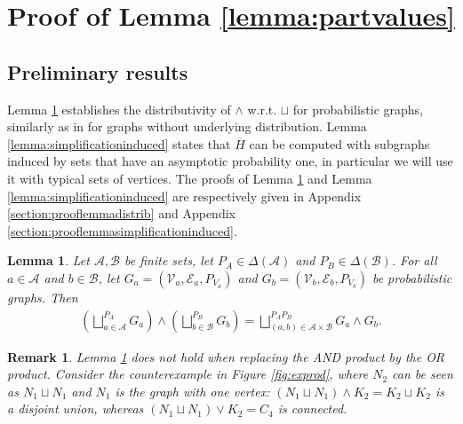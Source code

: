 \documentclass[conference,a4paper]{IEEEtran}
\newtheorem{lemma}{Lemma}
\newtheorem{remark}[theorem]{Remark}
\begin{document}
\section{Proof of Lemma \ref{lemma:partvalues}}\label{section:prooflemmapartvalues}

\subsection{Preliminary results}

Lemma \ref{lemma:distrib} establishes the distributivity of $\wedge$ w.r.t. $\sqcup$ for probabilistic graphs, similarly as in \cite{zuiddam2018algebraic} for graphs without underlying distribution. %
Lemma \ref{lemma:simplificationinduced} states that $\overline{H}$ can be computed with subgraphs induced by sets that have an asymptotic probability one, in particular we will use it with typical sets of vertices. The proofs of Lemma \ref{lemma:distrib} and Lemma \ref{lemma:simplificationinduced} are respectively given in Appendix \ref{section:prooflemmadistrib} and Appendix \ref{section:prooflemmasimplificationinduced}.

\begin{lemma}\label{lemma:distrib}
    Let $\mathcal{A}, \mathcal{B}$ be finite sets, let $P_A \in \Delta(\mathcal{A})$ and $P_B \in \Delta(\mathcal{B})$. For all $a \in \mathcal{A}$ and $b \in \mathcal{B}$, let $G_a = (\mathcal{V}_a, \mathcal{E}_a, P_{V_a})$ and $G_b = (\mathcal{V}_b, \mathcal{E}_b, P_{V_b})$ be probabilistic graphs. Then 
    \begin{align}
        \left(\bigsqcup_{a \in \mathcal{A}}^{P_A} G_a\right) \wedge \left(\bigsqcup_{b \in \mathcal{B}}^{P_B} G_b\right) = \bigsqcup_{(a,b) \in \mathcal{A} \times \mathcal{B}}^{P_AP_B} G_a \wedge G_b.\label{eq:distribunion}
    \end{align}
\end{lemma}

\iffalse
\begin{remark}
    Lemma \ref{lemma:distrib} does not hold when replacing the AND product by the OR product. Consider the counterexample in Figure \ref{fig:exprod}, where $N_2$ can be seen as $N_1 \sqcup N_1$ and $N_1$ is the graph with one vertex: $(N_1 \sqcup N_1) \wedge K_2 = K_2 \sqcup K_2$ is a disjoint union, whereas $(N_1 \sqcup N_1) \vee K_2 = C_4$ is connected.
\end{remark}
\end{document}
